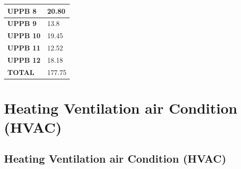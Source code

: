 \documentclass[12pt,fleqn]{book} %
\begin{document}
\begin{enumerate}
\begin{table}[h!]
\begin{tabular}{!{\color[rgb]{0.557,0.667,0.859}\vrule}l!{\color{black}\vrule}l!{\color[rgb]{0.557,0.667,0.859}\vrule}}
\hline
{} \textbf{UPPB 8}                                                                                                 & 20.80                                                                                                                 \\ 
\hline
\textbf{UPPB 9}                                                                                                                                   & 13.8                                                                                                                  \\ 
\hline
{} \textbf{UPPB 10}                                                                                                & 19.45                                                                                                                 \\ 
\hline
\textbf{UPPB 11}                                                                                                                                  & 12.52                                                                                                                 \\ 
\hline
{} \textbf{UPPB 12}                                                                                                & 18.18                                                                                                                 \\ 
\hline
\textbf{TOTAL}                                                                                                                                    & 177.75                                                                                                                \\
\hline
\end{tabular}
\end{table}
\end{enumerate}
\part {Heating Ventilation air Condition (HVAC)}

\chapter{Heating Ventilation air Condition (HVAC)}

\end{document}
